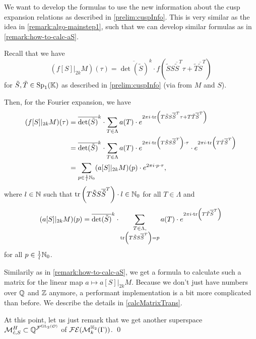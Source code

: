 \begin{remark}
\label{remark:algo-mainstep2}
We want to develop the formulas to use the new information about the cusp expansion relations as described in \cref{prelim:cuspInfo}. This is very similar as the idea in \cref{remark:algo-mainstep1}, such that we can develop similar formulas as in \cref{remark:how-to-calc-aS}.

Recall that we have
\[ (f[S] |_{2k} M) (\tau) = \overline{\det(\tilde{S})}^k \cdot f\left( \tilde{S} S \overline{\tilde{S}}^T \tau + \tilde{T} \overline{\tilde{S}}^T \right) \]
for $\tilde{S}, \tilde{T} \in \operatorname{Sp}_1(\mathbb{K})$ as described in \cref{prelim:cuspInfo} (via  from $M$ and $S$).

Then, for the Fourier expansion, we have
\begin{align*}
(f[S] |_{2k} M) (\tau)
&= \overline{\det(\tilde{S})}^k \cdot \sum_{T \in \Lambda} a(T) \cdot e^{2 \pi i \cdot \textup{\textrm{tr}}\left(T \tilde{S} S \overline{\tilde{S}}^T \tau + T \tilde{T} \overline{\tilde{S}}^T\right)} \\
&= \overline{\det(\tilde{S})}^k \cdot \sum_{T \in \Lambda} a(T) \cdot e^{2 \pi i \cdot \textup{\textrm{tr}}\left(T \tilde{S} S \overline{\tilde{S}}^T\right) \cdot \tau} \cdot e^{2 \pi i \cdot \textup{\textrm{tr}}\left(T \tilde{T} \overline{\tilde{S}}^T\right)} \\
&= \sum_{p \in \frac{1}{l} \mathbb{N}_0} (a[S]|_{2k} M) (p) \cdot e^{2 \pi i \cdot p \cdot \tau} ,
\end{align*}
where $l \in \mathbb{N}$ such that $\textup{\textrm{tr}}\left(T \tilde{S} S \overline{\tilde{S}}^T\right) \cdot l \in \mathbb{N}_0$ for all $T \in \Lambda$ and
\[ (a[S]|_{2k} M) (p) = \overline{\det(\tilde{S})}^k \cdot \sum_{\begin{subarray}{c}
T \in \Lambda,\\
\textup{\textrm{tr}}\left(T \tilde{S} S \overline{\tilde{S}}^T\right) = p
\end{subarray}} a(T) \cdot e^{2 \pi i \cdot \textup{\textrm{tr}}\left(T \tilde{T} \overline{\tilde{S}}^T\right)} \]
for all $p \in \frac{1}{l} \mathbb{N}_0$.

Similarily as in \cref{remark:how-to-calc-aS}, we get a formula to calculate such a matrix for the linear map $a \mapsto a[S]|_{2k} M$. Because we don't just have numbers over $\mathbb{Q}$ and $\mathbb{Z}$ anymore, a performant implementation is a bit more complicated than before. We describe the details in \cref{calcMatrixTrans}.

At this point, let us just remark that we get another superspace $\mathcal{M}^H_{\hat{c},S} \subset \mathbb{Q}^{{\mathcal{F}}^{\operatorname{GL}_2(\mathcal{O})}}$ of $\mathcal{FE}(\operatorname{\mathcal{M}}^{\mathbb{H}_{2}}_{k} (\Gamma))$. \qed
\end{remark}

